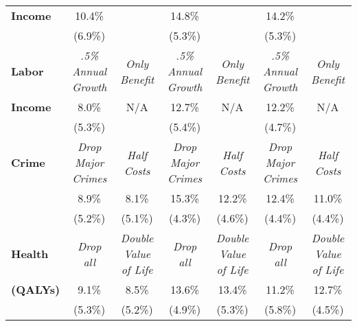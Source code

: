 \begin{tabular}{>{\bfseries}lcccccc}
Income	&	10.4\%	&		&	14.8\%	&		&	14.2\%	&		\\
	&	(6.9\%)	&		&	(5.3\%) &		&	(5.3\%)	&		\\ \midrule
Labor	&	\textit{.5\% Annual Growth}	&	\textit{Only Benefit}	&	\textit{.5\% Annual Growth}	&	\textit{Only Benefit}	&	\textit{.5\% Annual Growth}	&	\textit{Only Benefit}	\\
Income	&	8.0\%	&	N/A	&	12.7\%	&	N/A	&	12.2\%	&	N/A	\\
	&	(5.3\%)	&		&	(5.4\%) &		&	(4.7\%)	&		\\ \midrule
Crime	&	\textit{Drop Major Crimes}	&	\textit{Half Costs}	&	\textit{Drop Major Crimes}	&	\textit{Half Costs}	&	\textit{Drop Major Crimes}	&	\textit{Half Costs}	\\
	&	8.9\%	&	8.1\%	&	15.3\%	&	12.2\%	&	12.4\%	&	11.0\%	\\
	&	(5.2\%)	&	(5.1\%)	&	(4.3\%)	&	(4.6\%)	&	(4.4\%)	&	(4.4\%)	\\ \midrule
Health	&	\textit{Drop all}	&	\textit{Double Value of Life}	&	\textit{Drop all}	&	\textit{Double Value of Life}	&	\textit{Drop all}	&	\textit{Double Value of Life}	\\
(QALYs)	&	9.1\%	&	8.5\%	&	13.6\%	&	13.4\%	&	11.2\%	&	12.7\%	\\
	&	(5.3\%)	&	(5.2\%)	&	(4.9\%)	&	(5.3\%)	&	(5.8\%)	&	(4.5\%)	\\ \bottomrule
\end{tabular}